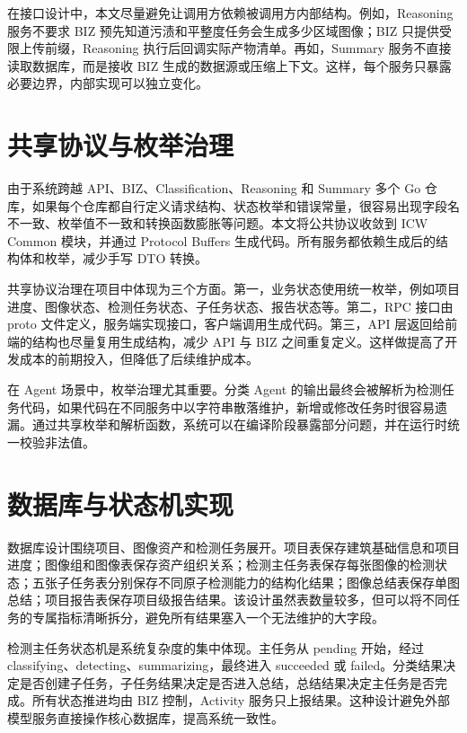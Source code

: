 在接口设计中，本文尽量避免让调用方依赖被调用方内部结构。例如，Reasoning 服务不要求 BIZ 预先知道污渍和平整度任务会生成多少区域图像；BIZ 只提供受限上传前缀，Reasoning 执行后回调实际产物清单。再如，Summary 服务不直接读取数据库，而是接收 BIZ 生成的数据源或压缩上下文。这样，每个服务只暴露必要边界，内部实现可以独立变化。

\section{共享协议与枚举治理}
\label{sec:impl-common-protocol}

由于系统跨越 API、BIZ、Classification、Reasoning 和 Summary 多个 Go 仓库，如果每个仓库都自行定义请求结构、状态枚举和错误常量，很容易出现字段名不一致、枚举值不一致和转换函数膨胀等问题。本文将公共协议收敛到 ICW Common 模块，并通过 Protocol Buffers 生成代码。所有服务都依赖生成后的结构体和枚举，减少手写 DTO 转换。

共享协议治理在项目中体现为三个方面。第一，业务状态使用统一枚举，例如项目进度、图像状态、检测任务状态、子任务状态、报告状态等。第二，RPC 接口由 proto 文件定义，服务端实现接口，客户端调用生成代码。第三，API 层返回给前端的结构也尽量复用生成结构，减少 API 与 BIZ 之间重复定义。这样做提高了开发成本的前期投入，但降低了后续维护成本。

在 Agent 场景中，枚举治理尤其重要。分类 Agent 的输出最终会被解析为检测任务代码，如果代码在不同服务中以字符串散落维护，新增或修改任务时很容易遗漏。通过共享枚举和解析函数，系统可以在编译阶段暴露部分问题，并在运行时统一校验非法值。

\section{数据库与状态机实现}
\label{sec:impl-db-state}

数据库设计围绕项目、图像资产和检测任务展开。项目表保存建筑基础信息和项目进度；图像组和图像表保存资产组织关系；检测主任务表保存每张图像的检测状态；五张子任务表分别保存不同原子检测能力的结构化结果；图像总结表保存单图总结；项目报告表保存项目级报告结果。该设计虽然表数量较多，但可以将不同任务的专属指标清晰拆分，避免所有结果塞入一个无法维护的大字段。

检测主任务状态机是系统复杂度的集中体现。主任务从 pending 开始，经过 classifying、detecting、summarizing，最终进入 succeeded 或 failed。分类结果决定是否创建子任务，子任务结果决定是否进入总结，总结结果决定主任务是否完成。所有状态推进均由 BIZ 控制，Activity 服务只上报结果。这种设计避免外部模型服务直接操作核心数据库，提高系统一致性。

